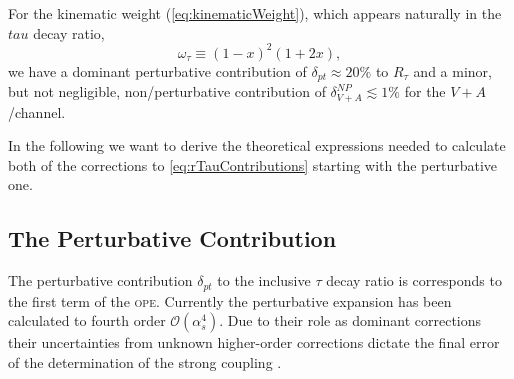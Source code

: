 \documentclass[../../index.tex]{subfiles}
\begin{document}
For the kinematic weight (\cref{eq:kinematicWeight}), which appears naturally in the \(tau\) decay ratio,
\begin{equation}
  \omega_\tau \equiv (1-x)^2(1+2x),
\end{equation}
we have a dominant perturbative contribution of \(\delta_{pt} \approx 20\%\) to
\(R_\tau\) \cite{Pich2013} and a minor, but not negligible, non\-/perturbative
contribution of \(\delta_{V+A}^{NP} \lesssim 1\% \) \cite{Jamin2013} for the
\(V+A\)\-/channel.

In the following we want to derive the theoretical expressions needed to
calculate both of the corrections to \cref{eq:rTauContributions} starting with
the perturbative one.


\subsection{The Perturbative Contribution}
The perturbative contribution \(\delta_{pt}\) to the inclusive \(\tau\) decay
ratio is corresponds to the first term of the \textsc{ope}. Currently the
perturbative expansion has been calculated to fourth order
\(\mathcal{O}(\alpha_s^4)\). Due to their role as dominant corrections their
uncertainties from unknown higher-order corrections dictate the final error of
the determination of the strong coupling \cite{Pich2016}.
\end{document}
